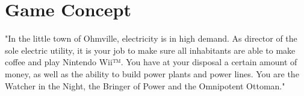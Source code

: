 \chapter{Game Concept}

	"In the little town of Ohmville, electricity is in high demand. As director of the sole electric 
	utility, it is your job to make sure all inhabitants are able to make coffee and play Nintendo Wii™. 
	You have at your disposal a certain amount of money, as well as the ability to build power plants 
	and power lines. You are the Watcher in the Night, the Bringer of Power and the Omnipotent Ottoman."


